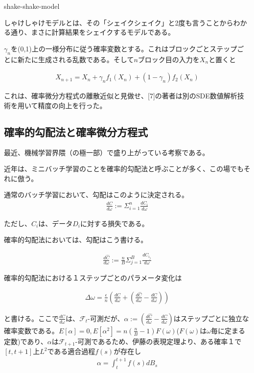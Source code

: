 \documentclass[dvipdfmx, a4paper]{jsarticle}
\begin{document}
shake-shake-model

しゃけしゃけモデルとは、その「シェイクシェイク」と2度も言うことからわかる通り、まさに計算結果をシェイクするモデルである。

$\gamma_n$を(0,1)上の一様分布に従う確率変数とする。これはブロックごとステップごとに新たに生成される乱数である。そして$n$ブロック目の入力を$X_n$と置くと

\begin{align}
X_{n+1}=X_n+\gamma_n f_1(X_n)+(1-\gamma_n)f_2(X_n) 
\end{align}

これは、確率微分方程式の離散近似と見做せ、[7]の著者は別のSDE数値解析技術を用いて精度の向上を行った。

\subsection{確率的勾配法と確率微分方程式}
最近、機械学習界隈（の極一部）で盛り上がっている考察である。

近年は、ミニバッチ学習のことを確率的勾配法と呼ぶことが多く、この場でもそれに倣う。

通常のバッチ学習において、勾配はこのように決定される。
\begin{align}
\frac{dC}{d\omega}:=\Sigma_{i=1}^n \frac{dC_i}{d\omega}
\end{align}

ただし、$C_i$は、データ$D_i$に対する損失である。

確率的勾配法においては、勾配はこう書ける。

\begin{align}
\frac{d\hat{C}}{d\omega}:=\frac{n}{B}\Sigma_{j=1}^B \frac{dC_{i_j}}{d\omega}
\end{align}

確率的勾配法における１ステップごとのパラメータ変化は

\begin{align}
\Delta\omega=\frac{\epsilon}{n}(\frac{dC}{d\omega}+(\frac{d\hat{C}}{d\omega}-\frac{dC}{d\omega}))
\end{align}

と書ける。ここで$\frac{dC}{d\omega}$は、$\mathcal{F}_t$-可測だが、$\alpha := (\frac{d\hat{C}}{d\omega}-\frac{dC}{d\omega})$はステップごとに独立な確率変数である。$E[\alpha]=0,E[\alpha^2]=n(\frac{n}{B}-1)F(\omega)$($F(\omega)$は$\omega$毎に定まる定数)であり、$\alpha$は$\mathcal{F}_{t+1}$-可測であるため、伊藤の表現定理より、ある確率１で$[t,t+1]$上$L^2$である適合過程$f(s)$が存在し
\begin{align}
\alpha = \int^{t+1}_t f(s)dB_s
\end{align}
\end{document}
